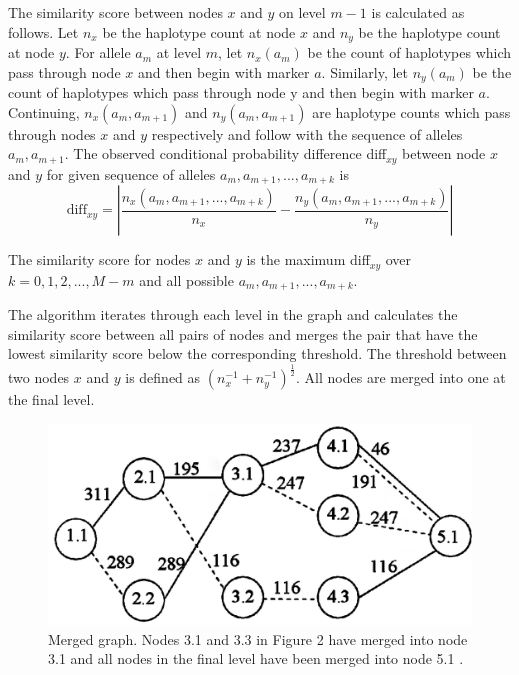 \documentclass[a4paper,11pt,twoside,abstraction,titlepage]{article}
\begin{document}
The similarity score between nodes $x$ and $y$ on level $m-1$ is calculated as follows.  Let $n_x$ be the haplotype count at node $x$ and $n_y$ be the haplotype count at node $y$.  For allele $a_m$ at level $m$, let $n_x(a_m)$ be the count of haplotypes which pass through node $x$ and then begin with marker $a$.  Similarly, let $n_y(a_m)$ be the count of haplotypes which pass through node y and then begin with marker $a$.  Continuing, $n_x(a_m,a_{m+1})$ and $n_y(a_m,a_{m+1})$ are haplotype counts which pass through nodes $x$ and $y$ respectively and follow with the sequence of alleles $a_m,a_{m+1}$.  The observed conditional probability difference diff$_{xy}$ between node $x$ and $y$ for given sequence of alleles $a_m,a_{m+1},...,a_{m+k}$ is
\begin{equation*}
\mbox{diff}_{xy} = \left|\frac{n_x(a_m,a_{m+1},...,a_{m+k})}{n_x} - \frac{n_y(a_m,a_{m+1},...,a_{m+k})}{n_y}\right|
\end{equation*}


\noindent The similarity score for nodes $x$ and $y$ is the maximum diff$_{xy}$ over $k=0, 1, 2,..., M-m$ and all possible $a_m,a_{m+1},...,a_{m+k}$.

The algorithm iterates through each level in the graph and calculates the similarity score between all pairs of nodes and merges the pair that have the lowest similarity score below the corresponding threshold.  The threshold between two nodes $x$ and $y$ is defined as $(n_x^{-1} + n_y^{-1})^{\frac{1}{2}}$.  All nodes are merged into one at the final level.

\begin{figure}[htp!]

\begin{center}
\centerline{\includegraphics[scale=0.08]{fig4}}
\caption{Merged graph.  Nodes 3.1 and 3.3 in Figure 2 have merged into node 3.1 and all nodes in the final level have been merged into node 5.1 \cite{beagle1}.}

\end{center}
\vspace{-20pt}
\end{figure}
\end{document}
